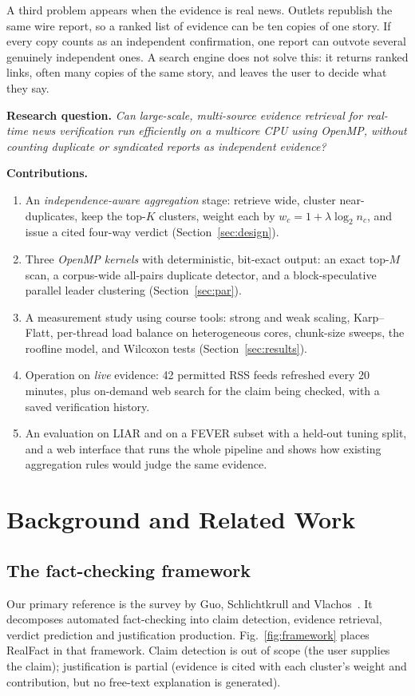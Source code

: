 \documentclass[conference,a4paper]{IEEEtran}
\begin{document}
A third problem appears when the evidence is real news. Outlets republish the same wire report, so a ranked list of
evidence can be ten copies of one story. If every copy counts as an independent confirmation, one report can outvote
several genuinely independent ones. A search engine does not solve this: it returns ranked links, often many copies of
the same story, and leaves the user to decide what they say.

\textbf{Research question.} \emph{Can large-scale, multi-source evidence retrieval for real-time news verification run
efficiently on a multicore CPU using OpenMP, without counting duplicate or syndicated reports as independent evidence?}

\textbf{Contributions.}
\begin{enumerate}
  \item An \emph{independence-aware aggregation} stage: retrieve wide, cluster near-duplicates, keep the top-$K$
  clusters, weight each by $w_c=1+\lambda\log_2 n_c$, and issue a cited four-way verdict (Section~\ref{sec:design}).
  \item Three \emph{OpenMP kernels} with deterministic, bit-exact output: an exact top-$M$ scan, a corpus-wide
  all-pairs duplicate detector, and a block-speculative parallel leader clustering (Section~\ref{sec:par}).
  \item A measurement study using course tools: strong and weak scaling, Karp--Flatt, per-thread load balance on
  heterogeneous cores, chunk-size sweeps, the roofline model, and Wilcoxon tests (Section~\ref{sec:results}).
  \item Operation on \emph{live} evidence: 42 permitted RSS feeds refreshed every 20 minutes, plus on-demand web
  search for the claim being checked, with a saved verification history.
  \item An evaluation on LIAR and on a FEVER subset with a held-out tuning split, and a web interface that runs the
  whole pipeline and shows how existing aggregation rules would judge the same evidence.
\end{enumerate}

\section{Background and Related Work}
\label{sec:related}

\subsection{The fact-checking framework}
Our primary reference is the survey by Guo, Schlichtkrull and Vlachos~\cite{guo2022}. It decomposes automated
fact-checking into claim detection, evidence retrieval, verdict prediction and justification production.
Fig.~\ref{fig:framework} places RealFact in that framework. Claim detection is out of scope (the user supplies the
claim); justification is partial (evidence is cited with each cluster's weight and contribution, but no free-text
explanation is generated).
\end{document}
